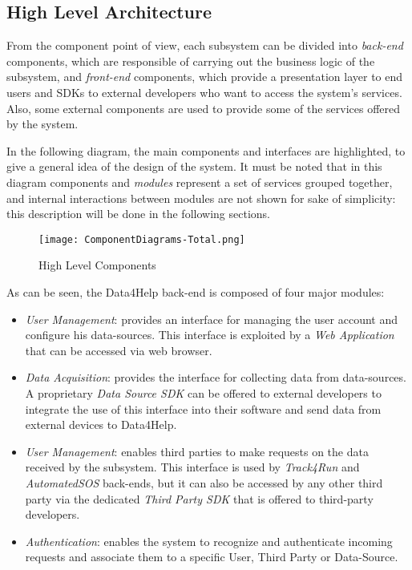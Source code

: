 \subsection{High Level Architecture}

From the component point of view, each subsystem can be divided into \textit{back-end} components, which are responsible of carrying out the business logic of the subsystem, and \textit{front-end} components, which provide a presentation layer to end users and SDKs to external developers who want to access the system's services.
Also, some external components are used to provide some of the services offered by the system.

In the following diagram, the main components and interfaces are highlighted, to give a general idea of the design of the system.
It must be noted that in this diagram components and \textit{modules} represent a set of services grouped together, and internal interactions between modules are not shown for sake of simplicity: this description will be done in the following sections.

\FloatBarrier
\begin{figure}[!h]
	\centering
	\texttt{[image: ComponentDiagrams-Total.png]}
	\caption{High Level Components}
\end{figure}
\FloatBarrier

As can be seen, the Data4Help back-end is composed of four major modules:

\begin{itemize}
	\item \textit{User Management}: provides an interface for managing the user account and configure his data-sources. This interface is exploited by a \textit{Web Application} that can be accessed via web browser.
	\item \textit{Data Acquisition}: provides the interface for collecting data from data-sources. A proprietary \textit{Data Source SDK} can be offered to external developers to integrate the use of this interface into their software and send data from external devices to Data4Help.
	\item \textit{User Management}: enables third parties to make requests on the data received by the subsystem. This interface is used by \textit{Track4Run} and \textit{AutomatedSOS} back-ends, but it can also be accessed by any other third party via the dedicated \textit{Third Party SDK} that is offered to third-party developers.
	\item \textit{Authentication}: enables the system to recognize and authenticate incoming requests and associate them to a specific User, Third Party or Data-Source.
\end{itemize}

